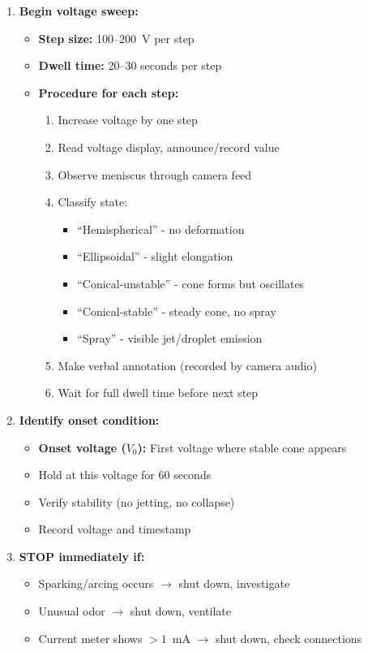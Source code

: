 \documentclass[11pt]{article}
\begin{document}
\begin{enumerate}
\item \textbf{Begin voltage sweep:}
  \begin{itemize}
  \item \textbf{Step size:} 100--200~V per step
  \item \textbf{Dwell time:} 20--30 seconds per step
  \item \textbf{Procedure for each step:}
    \begin{enumerate}
    \item Increase voltage by one step
    \item Read voltage display, announce/record value
    \item Observe meniscus through camera feed
    \item Classify state:
      \begin{itemize}
      \item ``Hemispherical'' - no deformation
      \item ``Ellipsoidal'' - slight elongation
      \item ``Conical-unstable'' - cone forms but oscillates
      \item ``Conical-stable'' - steady cone, no spray
      \item ``Spray'' - visible jet/droplet emission
      \end{itemize}
    \item Make verbal annotation (recorded by camera audio)
    \item Wait for full dwell time before next step
    \end{enumerate}
  \end{itemize}

\item \textbf{Identify onset condition:}
  \begin{itemize}
  \item \textbf{Onset voltage ($V_0$):} First voltage where stable cone appears
  \item Hold at this voltage for 60 seconds
  \item Verify stability (no jetting, no collapse)
  \item Record voltage and timestamp
  \end{itemize}

\item \textbf{STOP immediately if:}
  \begin{itemize}
  \item Sparking/arcing occurs $\rightarrow$ shut down, investigate
  \item Unusual odor $\rightarrow$ shut down, ventilate
  \item Current meter shows $>1$~mA $\rightarrow$ shut down, check connections
  \end{itemize}
\end{enumerate}
\end{document}
